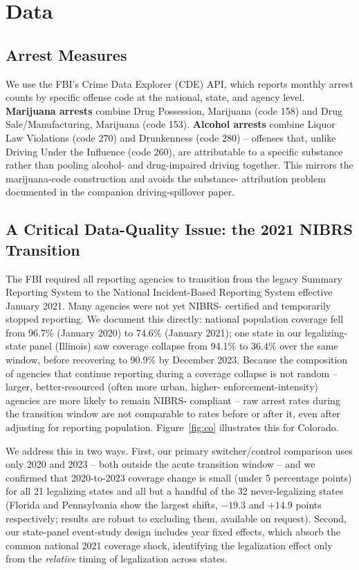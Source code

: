 \documentclass[11pt]{article}
\begin{document}
\section{Data}

\subsection{Arrest Measures}

We use the FBI's Crime Data Explorer (CDE) API, which reports monthly
arrest counts by specific offense code at the national, state, and
agency level. \textbf{Marijuana arrests} combine Drug Possession,
Marijuana (code 158) and Drug Sale/Manufacturing, Marijuana (code
153). \textbf{Alcohol arrests} combine Liquor Law Violations (code
270) and Drunkenness (code 280) -- offenses that, unlike Driving Under
the Influence (code 260), are attributable to a specific substance
rather than pooling alcohol- and drug-impaired driving together. This
mirrors the marijuana-code construction and avoids the substance-
attribution problem documented in the companion driving-spillover
paper.

\subsection{A Critical Data-Quality Issue: the 2021 NIBRS Transition}

The FBI required all reporting agencies to transition from the legacy
Summary Reporting System to the National Incident-Based Reporting
System effective January 2021. Many agencies were not yet NIBRS-
certified and temporarily stopped reporting. We document this directly:
national population coverage fell from 96.7\% (January 2020) to 74.6\%
(January 2021); one state in our legalizing-state panel (Illinois) saw
coverage collapse from 94.1\% to 36.4\% over the same window, before
recovering to 90.9\% by December 2023. Because the composition of
agencies that continue reporting during a coverage collapse is not
random -- larger, better-resourced (often more urban, higher-
enforcement-intensity) agencies are more likely to remain NIBRS-
compliant -- raw arrest rates during the transition window are not
comparable to rates before or after it, even after adjusting for
reporting population. Figure~\ref{fig:co} illustrates this for Colorado.

We address this in two ways. First, our primary switcher/control
comparison uses only 2020 and 2023 -- both outside the acute transition
window -- and we confirmed that 2020-to-2023 coverage change is small
(under 5 percentage points) for all 21 legalizing states and all but a
handful of the 32 never-legalizing states (Florida and Pennsylvania
show the largest shifts, $-19.3$ and $+14.9$ points respectively;
results are robust to excluding them, available on request). Second,
our state-panel event-study design includes year fixed effects, which
absorb the common national 2021 coverage shock, identifying the
legalization effect only from the \emph{relative} timing of
legalization across states.
\end{document}
